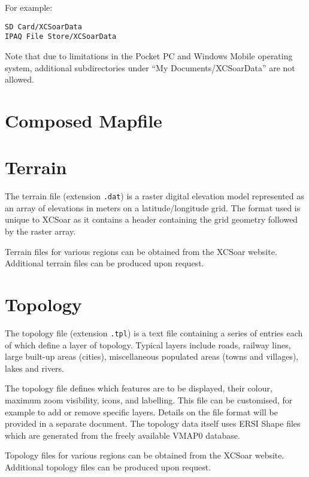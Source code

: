For example:
\begin{verbatim}
SD Card/XCSoarData
IPAQ File Store/XCSoarData
\end{verbatim}


Note that due to limitations in the Pocket PC and Windows Mobile
operating system, additional subdirectories under ``My
Documents/XCSoarData'' are not allowed.

\section{Composed Mapfile}


\section{Terrain}

The terrain file (extension \verb|.dat|) is a raster digital elevation
model represented as an array of elevations in meters on a
latitude/longitude grid.  The format used is unique to XCSoar as it
contains a header containing the grid geometry followed by the raster
array.

Terrain files for various regions can be obtained from the XCSoar website.
Additional terrain files can be produced upon request.

\section{Topology}

The topology file (extension \verb|.tpl|) is a text file containing a
series of entries each of which define a layer of topology.  Typical
layers include roads, railway lines, large built-up areas (cities),
miscellaneous populated areas (towns and villages), lakes and rivers.

The topology file defines which features are to be displayed, their
colour, maximum zoom visibility, icons, and labelling.  This file can
be customised, for example to add or remove specific layers.  Details
on the file format will be provided in a separate document.  The
topology data itself uses ERSI Shape files which are generated from the
freely available VMAP0 database.

Topology files for various regions can be obtained from the XCSoar
website.  Additional topology files can be produced upon request.

